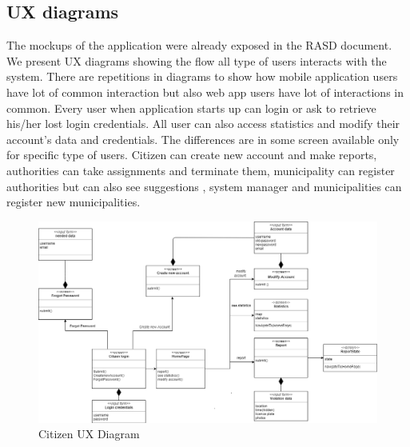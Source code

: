 \subsection{UX diagrams}
The mockups of the application were already exposed in the RASD document.
\newline
We present UX diagrams showing the flow all type of users interacts with the system. 
There are repetitions in diagrams to show how mobile application users have lot of common interaction but also web app users have lot of interactions in common.
Every user when application starts up can login or ask to retrieve his/her lost login credentials.
All user can also access statistics and modify their account's data and credentials.
The differences are in some screen available only for specific type of users.
Citizen can create new account and make reports, authorities can take assignments and terminate them, municipality can register  authorities but can also see suggestions , system manager and municipalities can register new municipalities. 
\begin{figure}[h]
\centering
\includegraphics[width=\textwidth]{Images/ux1-correct.png}
\caption{\label{fig:ls}Citizen UX Diagram }
\end{figure}

